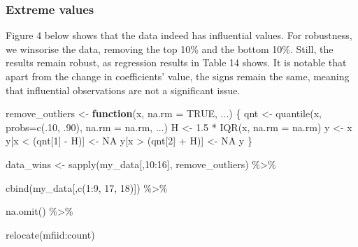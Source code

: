 \documentclass[a4paper,nobind]{templates/ociamthesis}
\newenvironment{Shaded}{\begin{snugshade}}{\end{snugshade}}
\newcommand{\AttributeTok}[1]{\textcolor[rgb]{0.77,0.63,0.00}{#1}}
\newcommand{\ConstantTok}[1]{\textcolor[rgb]{0.00,0.00,0.00}{#1}}
\newcommand{\ControlFlowTok}[1]{\textcolor[rgb]{0.13,0.29,0.53}{\textbf{#1}}}
\newcommand{\DecValTok}[1]{\textcolor[rgb]{0.00,0.00,0.81}{#1}}
\newcommand{\FloatTok}[1]{\textcolor[rgb]{0.00,0.00,0.81}{#1}}
\newcommand{\FunctionTok}[1]{\textcolor[rgb]{0.00,0.00,0.00}{#1}}
\newcommand{\NormalTok}[1]{#1}
\newcommand{\OtherTok}[1]{\textcolor[rgb]{0.56,0.35,0.01}{#1}}
\newcommand{\SpecialCharTok}[1]{\textcolor[rgb]{0.00,0.00,0.00}{#1}}
\renewenvironment{Shaded}
{
  \vspace{10pt}%
  \begin{snugshade}%
}{%
  \end{snugshade}%
  \vspace{8pt}%
}
\begin{document}
\hypertarget{extreme-values}{%
\subsubsection{Extreme values}\label{extreme-values}}

Figure 4 below shows that the data indeed has influential values. For robustness, we winsorise the data, removing the top 10\% and the bottom 10\%. Still, the results remain robust, as regression results in Table 14 shows. It is notable that apart from the change in coefficients' value, the signs remain the same, meaning that influential observations are not a significant issue.

\begin{Shaded}
\begin{Highlighting}[]
\NormalTok{remove\_outliers }\OtherTok{\textless{}{-}} \ControlFlowTok{function}\NormalTok{(x, }\AttributeTok{na.rm =} \ConstantTok{TRUE}\NormalTok{, ...) \{}
\NormalTok{  qnt }\OtherTok{\textless{}{-}} \FunctionTok{quantile}\NormalTok{(x, }\AttributeTok{probs=}\FunctionTok{c}\NormalTok{(.}\DecValTok{10}\NormalTok{, .}\DecValTok{90}\NormalTok{), }\AttributeTok{na.rm =}\NormalTok{ na.rm, ...)}
\NormalTok{  H }\OtherTok{\textless{}{-}} \FloatTok{1.5} \SpecialCharTok{*} \FunctionTok{IQR}\NormalTok{(x, }\AttributeTok{na.rm =}\NormalTok{ na.rm)}
\NormalTok{  y }\OtherTok{\textless{}{-}}\NormalTok{ x}
\NormalTok{  y[x }\SpecialCharTok{\textless{}}\NormalTok{ (qnt[}\DecValTok{1}\NormalTok{] }\SpecialCharTok{{-}}\NormalTok{ H)] }\OtherTok{\textless{}{-}} \ConstantTok{NA}
\NormalTok{  y[x }\SpecialCharTok{\textgreater{}}\NormalTok{ (qnt[}\DecValTok{2}\NormalTok{] }\SpecialCharTok{+}\NormalTok{ H)] }\OtherTok{\textless{}{-}} \ConstantTok{NA}
\NormalTok{  y}
\NormalTok{\}}


\NormalTok{data\_wins }\OtherTok{\textless{}{-}} \FunctionTok{sapply}\NormalTok{(my\_data[,}\DecValTok{10}\SpecialCharTok{:}\DecValTok{16}\NormalTok{], remove\_outliers) }\SpecialCharTok{\%\textgreater{}\%} 
  
  \FunctionTok{cbind}\NormalTok{(my\_data[,}\FunctionTok{c}\NormalTok{(}\DecValTok{1}\SpecialCharTok{:}\DecValTok{9}\NormalTok{, }\DecValTok{17}\NormalTok{, }\DecValTok{18}\NormalTok{)]) }\SpecialCharTok{\%\textgreater{}\%} 
  
  \FunctionTok{na.omit}\NormalTok{() }\SpecialCharTok{\%\textgreater{}\%} 
  
  \FunctionTok{relocate}\NormalTok{(mfiid}\SpecialCharTok{:}\NormalTok{count)}
\end{Highlighting}
\end{Shaded}
\end{document}
